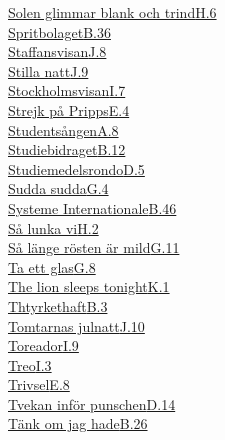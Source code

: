   \hyperref[solenglimmar]{Solen glimmar blank och trind}\dotfill\hyperref[solenglimmar]{H.6}\\
  \hyperref[spritbolaget]{Spritbolaget}\dotfill\hyperref[spritbolaget]{B.36}\\
  \hyperref[staffansvisan]{Staffansvisan}\dotfill\hyperref[staffansvisan]{J.8}\\
  \hyperref[sillanatt]{Stilla natt}\dotfill\hyperref[sillanatt]{J.9}\\
  \hyperref[stockholmsvisan]{Stockholmsvisan}\dotfill\hyperref[stockholmsvisan]{I.7}\\
  \hyperref[strejkpapripps]{Strejk på Pripps}\dotfill\hyperref[strejkpapripps]{E.4}\\
  \hyperref[studentsangen]{Studentsången}\dotfill\hyperref[studentsangen]{A.8}\\
  \hyperref[studiebidrag]{Studiebidraget}\dotfill\hyperref[studiebidrag]{B.12}\\
  \hyperref[studiemedelsrondo]{Studiemedelsrondo}\dotfill\hyperref[studiemedelsrondo]{D.5}\\
  \hyperref[suddasudda]{Sudda sudda}\dotfill\hyperref[suddasudda]{G.4}\\
  \hyperref[systemeinternationale]{Systeme Internationale}\dotfill\hyperref[systemeinternationale]{B.46}\\
  \hyperref[fredmanssangno21]{Så lunka vi}\dotfill\hyperref[fredmanssangno21]{H.2}\\
  \hyperref[salangerosten]{Så länge rösten är mild}\dotfill\hyperref[salangerosten]{G.11}\\
  \hyperref[taettglas]{Ta ett glas}\dotfill\hyperref[taettglas]{G.8}\\
  \hyperref[thelion]{The lion sleeps tonight}\dotfill\hyperref[thelion]{K.1}\\
  \hyperref[thtyrkethaft]{Thtyrkethaft}\dotfill\hyperref[thtyrkethaft]{B.3}\\
  \hyperref[tomtarnasjulnatt]{Tomtarnas julnatt}\dotfill\hyperref[tomtarnasjulnatt]{J.10}\\
  \hyperref[toreador]{Toreador}\dotfill\hyperref[toreador]{I.9}\\
  \hyperref[treo]{Treo}\dotfill\hyperref[treo]{I.3}\\
  \hyperref[trivsel]{Trivsel}\dotfill\hyperref[trivsel]{E.8}\\
  \hyperref[tvekaniforpunschen]{Tvekan inför punschen}\dotfill\hyperref[tvekaniforpunschen]{D.14}\\
  \hyperref[omjaghade]{Tänk om jag hade}\dotfill\hyperref[omjaghade]{B.26}\\
